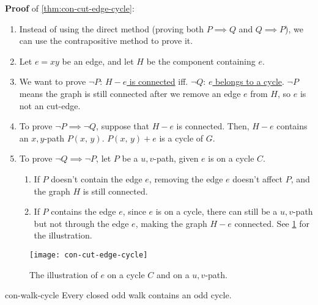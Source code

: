 \documentclass[../src/handouts/main.tex]{subfiles}
\begin{document}
\textbf{Proof} of \cref{thm:con-cut-edge-cycle}:
\begin{enumerate}
  \item Instead of using the direct method (proving both $P \implies Q$ and $Q \implies P$), we can use the contrapositive method to prove it.
  \item Let $e = xy$ be an edge, and let $H$ be the component containing $e$.
  \item We want to prove $\neg P$: \underline{$H-e$ is connected} iff. $\neg Q$: \underline{$e$ belongs to a cycle}. $\neg P$ means the graph is still connected after we remove an edge $e$ from $H$, so $e$ is not an cut-edge.
  \item To prove $\neg P \implies \neg Q$, suppose that $H-e$ is connected. Then, $H-e$ contains an $x,y$-path $P(x,\, y)$. $P(x,\, y) + e$ is a cycle of $G$.
  \item To prove $\neg Q \implies \neg P$, let $P$ be a $u,v$-path, given $e$ is on a cycle $C$.
    \begin{enumerate}
      \item If $P$ doesn't contain the edge $e$, removing the edge $e$ doesn't affect $P$, and the graph $H$ is still connected.
      \item If $P$ contains the edge $e$, since $e$ is on a cycle, there can still be a $u,v$-path but not through the edge $e$, making the graph $H-e$ connected. See \cref{fig:con-cut-edge-cycle} for the illustration.
    \end{enumerate}
\end{enumerate}

\begin{figure}[htbp]
  \centering
  \texttt{[image: con-cut-edge-cycle]}
  \caption{The illustration of $e$ on a cycle $C$ and on a $u,v$-path.}
  \label{fig:con-cut-edge-cycle}
\end{figure}

\begin{lemma}{}{con-walk-cycle}
  Every closed odd walk contains an odd cycle.
\end{lemma}
\end{document}
